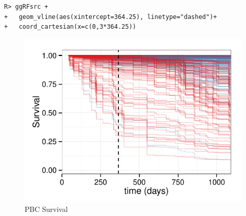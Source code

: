 \documentclass[nojss]{jss}\usepackage[]{graphicx}\usepackage[]{color}
\makeatletter
\def\maxwidth{ %
  \ifdim\Gin@nat@width>\linewidth
    \linewidth
  \else
    \Gin@nat@width
  \fi
}
\newenvironment{kframe}{%
 \def\at@end@of@kframe{}%
 \ifinner\ifhmode%
  \def\at@end@of@kframe{\end{minipage}}%
  \begin{minipage}{\columnwidth}%
 \fi\fi%
 \def\FrameCommand##1{\hskip\@totalleftmargin \hskip-\fboxsep
 \colorbox{shadecolor}{##1}\hskip-\fboxsep
     \hskip-\linewidth \hskip-\@totalleftmargin \hskip\columnwidth}%
 \MakeFramed {\advance\hsize-\width
   \@totalleftmargin\z@ \linewidth\hsize
   \@setminipage}}%
 {\par\unskip\endMakeFramed%
 \at@end@of@kframe}
\newenvironment{knitrout}{}{} %
\makeatother
\begin{document}
\begin{knitrout}\footnotesize
{}\color{fgcolor}\begin{kframe}
\begin{verbatim}
R> ggRFsrc +
+   geom_vline(aes(xintercept=364.25), linetype="dashed")+
+   coord_cartesian(x=c(0,3*364.25))
\end{verbatim}
\end{kframe}\begin{figure}[!htpb]

{\centering \includegraphics[width=\maxwidth]{figure/rfs-rfsrc-plot3Mnth-1} 

}

\caption[PBC Survival]{PBC Survival\label{fig:rfsrc-plot3Mnth}}
\end{figure}


\end{knitrout}
\end{document}
